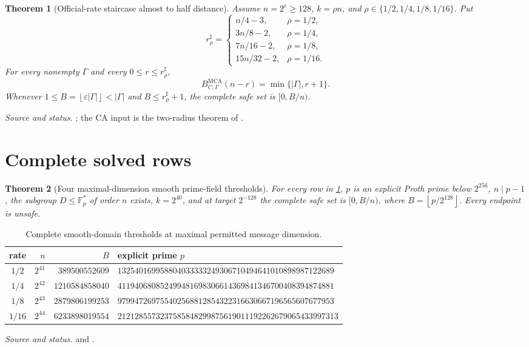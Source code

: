\documentclass[11pt,a4paper]{amsart}
\numberwithin{equation}{section}
\newtheorem{theorem}{Theorem}[section]
\theoremstyle{remark}
\DeclareMathOperator{\MCA}{MCA}
\newcommand{\F}{\mathbb F}
\newcommand{\eps}{\varepsilon}
\newcommand{\abs}[1]{\lvert#1\rvert}
\newcommand{\floor}[1]{\left\lfloor#1\right\rfloor}
\newcommand{\source}[1]{\par\smallskip\noindent\textit{Source and status.} #1\par}
\begin{document}
\begin{theorem}[Official-rate staircase almost to half distance]\label{thm:official}
Assume $n=2^e\ge128$, $k=\rho n$, and $\rho\in\{1/2,1/4,1/8,1/16\}$.  Put
\[
 r_\rho^\sharp=
 \begin{cases}
 n/4-3,&\rho=1/2,\\
 3n/8-2,&\rho=1/4,\\
 7n/16-2,&\rho=1/8,\\
 15n/32-2,&\rho=1/16.
 \end{cases}
\]
For every nonempty $\Gamma$ and every $0\le r\le r_\rho^\sharp$,
\[
 \boxed{B_{C,\Gamma}^{\MCA}(n-r)=\min\{\abs\Gamma,r+1\}.}
\]
Whenever $1\le B=\floor{\eps\abs\Gamma}<\abs\Gamma$ and $B\le r_\rho^\sharp+1$, the complete safe set is $[0,B/n)$.
\end{theorem}
\source{\cite{ChoShort26,ChoThresholds26}; the CA input is the two-radius theorem of \cite{BCHKS25}.}

\section{Complete solved rows}

\begin{theorem}[Four maximal-dimension smooth prime-field thresholds]\label{thm:proth}
For every row in \cref{tab:proth}, $p$ is an explicit Proth prime below $2^{256}$, $n\mid p-1$, the subgroup $D\le\F_p^*$ of order $n$ exists, $k=2^{40}$, and at target $2^{-128}$ the complete safe set is $[0,B/n)$, where $B=\floor{p/2^{128}}$.  Every endpoint is unsafe.
\end{theorem}

\begin{table}[ht]
\centering
\caption{Complete smooth-domain thresholds at maximal permitted message dimension.}
\label{tab:proth}
\small
\begin{tabularx}{\textwidth}{@{}c r r X@{}}
\toprule
rate & $n$ & $B$ & explicit prime $p$\\
\midrule
$1/2$ & $2^{41}$ & $389500552609$ & $132540169958804033333249306710494641010898987122689$\\
$1/4$ & $2^{42}$ & $1210584858040$ & $411940680852499481698306614369841346700408394874881$\\
$1/8$ & $2^{43}$ & $2879806199253$ & $979947269755402568812854322316630667196565607677953$\\
$1/16$& $2^{44}$ & $6233898019554$ & $2121285573237585848299875619011192262679065433997313$\\
\bottomrule
\end{tabularx}
\end{table}
\source{\cite[Reproducible finite Prize instances]{ChoShort26} and \cite[Four certified smooth rows]{ChoThresholds26}.}
\end{document}
